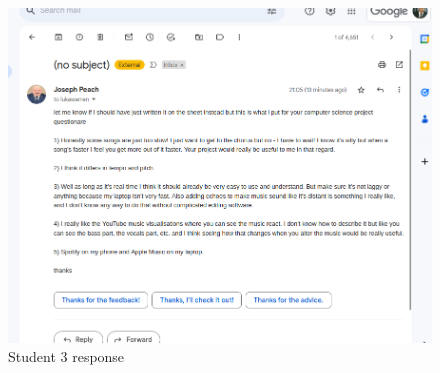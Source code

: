 \documentclass{article}
\begin{document}
	\begin{figure}[H]
		\includegraphics[width=14cm]{./joseph interview.png}
		\caption{Student 3 response}
	\end{figure}
	
	\pagebreak
\end{document}
